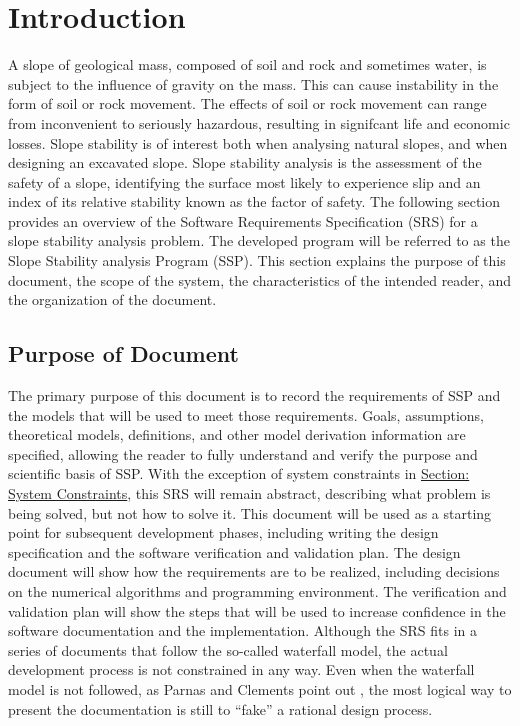 \documentclass[12pt]{article}
\begin{document}
\section{Introduction}
\label{Sec:Intro}
A slope of geological mass, composed of soil and rock and sometimes water, is subject to the influence of gravity on the mass. This can cause instability in the form of soil or rock movement. The effects of soil or rock movement can range from inconvenient to seriously hazardous, resulting in signifcant life and economic losses. Slope stability is of interest both when analysing natural slopes, and when designing an excavated slope. Slope stability analysis is the assessment of the safety of a slope, identifying the surface most likely to experience slip and an index of its relative stability known as the factor of safety.
The following section provides an overview of the Software Requirements Specification (SRS) for a slope stability analysis problem. The developed program will be referred to as the Slope Stability analysis Program (SSP). This section explains the purpose of this document, the scope of the system, the characteristics of the intended reader, and the organization of the document.
\subsection{Purpose of Document}
\label{Sec:DocPurpose}
The primary purpose of this document is to record the requirements of SSP and the models that will be used to meet those requirements. Goals, assumptions, theoretical models, definitions, and other model derivation information are specified, allowing the reader to fully understand and verify the purpose and scientific basis of SSP. With the exception of system constraints in \hyperref[Sec:SysConstraints]{Section: System Constraints}, this SRS will remain abstract, describing what problem is being solved, but not how to solve it.
This document will be used as a starting point for subsequent development phases, including writing the design specification and the software verification and validation plan. The design document will show how the requirements are to be realized, including decisions on the numerical algorithms and programming environment. The verification and validation plan will show the steps that will be used to increase confidence in the software documentation and the implementation. Although the SRS fits in a series of documents that follow the so-called waterfall model, the actual development process is not constrained in any way. Even when the waterfall model is not followed, as Parnas and Clements point out \cite{parnasClements1986}, the most logical way to present the documentation is still to ``fake'' a rational design process.
\end{document}
